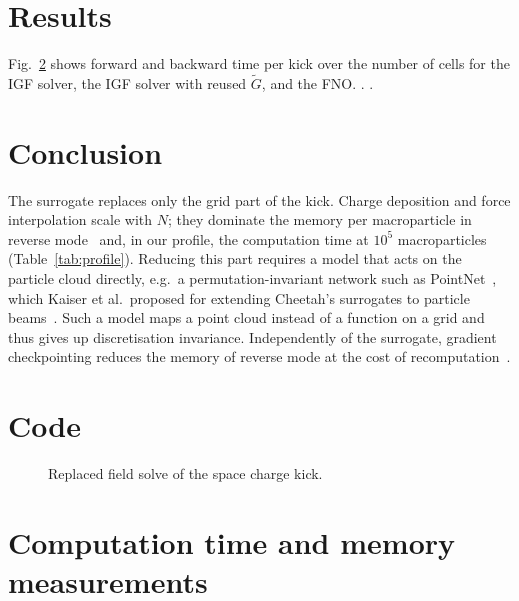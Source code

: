 \section{Results}
\label{sec:results}
Fig.~\ref{fig:timing} shows forward and backward time per kick over the
number of cells for the IGF solver, the IGF solver with reused $\tilde G$,
and the FNO. . .


\section{Conclusion}
\label{sec:conclusion}

The surrogate replaces only the grid part of the kick. Charge deposition
and force interpolation scale with $N$; they dominate the memory per
macroparticle in reverse mode~\cite{dhamrait2026memory} and, in our
profile, the computation time at $10^5$ macroparticles
(Table~\ref{tab:profile}). Reducing this part requires a model that acts on
the particle cloud directly, e.g.\ a permutation-invariant network such as
PointNet~\cite{qi2017pointnet}, which Kaiser et al.\ proposed for
extending Cheetah's surrogates to particle beams~\cite{kaiser2024cheetah}.
Such a model maps a point cloud instead of a function on a grid and thus
gives up discretisation invariance. Independently of the surrogate,
gradient checkpointing reduces the memory of reverse mode at the cost of
recomputation~\cite{dhamrait2026memory}.


\appendix
\section{Code}
\begin{figure}[h]
  \centering
  \caption{Replaced field solve of the space charge kick.}
  \label{lst:solve}
\end{figure}

\section{Computation time and memory measurements}
\begin{figure}[h]
  \centering
  \caption{}
  \label{fig:timing}
\end{figure}
